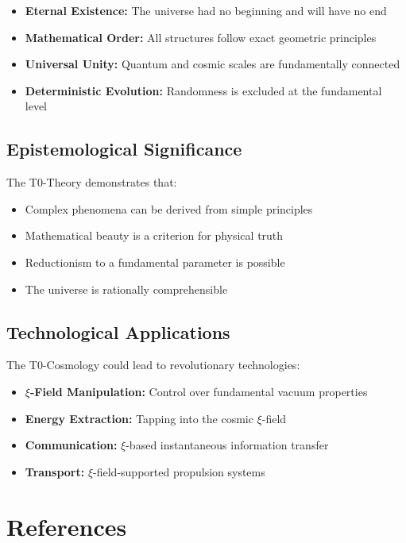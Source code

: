 	\begin{itemize}
		\item \textbf{Eternal Existence:} The universe had no beginning and will have no end
		\item \textbf{Mathematical Order:} All structures follow exact geometric principles
		\item \textbf{Universal Unity:} Quantum and cosmic scales are fundamentally connected
		\item \textbf{Deterministic Evolution:} Randomness is excluded at the fundamental level
	\end{itemize}
	
	\subsection{Epistemological Significance}
	
	The T0-Theory demonstrates that:
	
	\begin{itemize}
		\item Complex phenomena can be derived from simple principles
		\item Mathematical beauty is a criterion for physical truth
		\item Reductionism to a fundamental parameter is possible
		\item The universe is rationally comprehensible
	\end{itemize}

	\subsection{Technological Applications}
	
	The T0-Cosmology could lead to revolutionary technologies:
	
	\begin{itemize}
		\item \textbf{$\xi$-Field Manipulation:} Control over fundamental vacuum properties
		\item \textbf{Energy Extraction:} Tapping into the cosmic $\xi$-field
		\item \textbf{Communication:} $\xi$-based instantaneous information transfer
		\item \textbf{Transport:} $\xi$-field-supported propulsion systems
	\end{itemize}
	
	\section{References}
	

